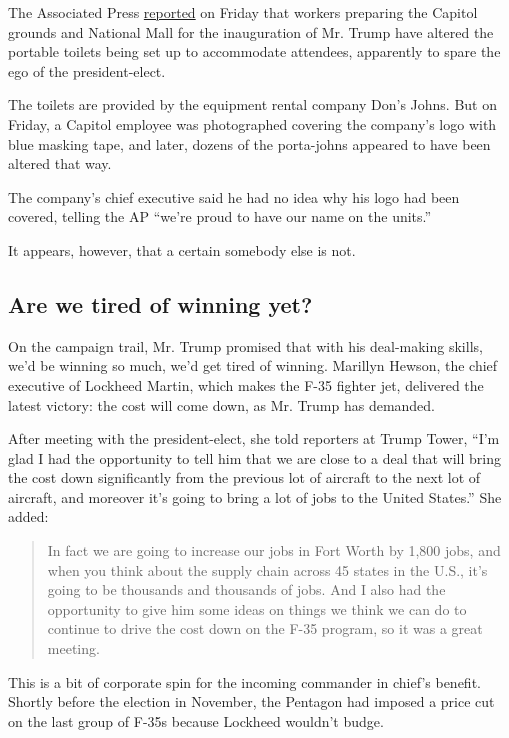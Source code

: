The Associated Press
\href{https://www.apnews.com/b2159d51ff7b47cc97a03c10d0954994}{reported}
on Friday that workers preparing the Capitol grounds and National Mall
for the inauguration of Mr. Trump have altered the portable toilets
being set up to accommodate attendees, apparently to spare the ego of
the president-elect.

The toilets are provided by the equipment rental company Don's Johns.
But on Friday, a Capitol employee was photographed covering the
company's logo with blue masking tape, and later, dozens of the
porta-johns appeared to have been altered that way.

The company's chief executive said he had no idea why his logo had been
covered, telling the AP ``we're proud to have our name on the units.''

It appears, however, that a certain somebody else is not.

\hypertarget{are-we-tired-of-winning-yet}{%
\subsection{Are we tired of winning
yet?}\label{are-we-tired-of-winning-yet}}

On the campaign trail, Mr. Trump promised that with his deal-making
skills, we'd be winning so much, we'd get tired of winning. Marillyn
Hewson, the chief executive of Lockheed Martin, which makes the F-35
fighter jet, delivered the latest victory: the cost will come down, as
Mr. Trump has demanded.

After meeting with the president-elect, she told reporters at Trump
Tower, ``I'm glad I had the opportunity to tell him that we are close to
a deal that will bring the cost down significantly from the previous lot
of aircraft to the next lot of aircraft, and moreover it's going to
bring a lot of jobs to the United States.'' She added:

\begin{quote}
In fact we are going to increase our jobs in Fort Worth by 1,800 jobs,
and when you think about the supply chain across 45 states in the U.S.,
it's going to be thousands and thousands of jobs. And I also had the
opportunity to give him some ideas on things we think we can do to
continue to drive the cost down on the F-35 program, so it was a great
meeting.
\end{quote}

This is a bit of corporate spin for the incoming commander in chief's
benefit. Shortly before the election in November, the Pentagon had
imposed a price cut on the last group of F-35s because Lockheed wouldn't
budge.


